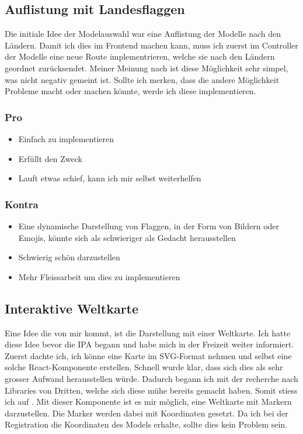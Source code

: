 \subsection{Auflistung mit Landesflaggen} \label{mdlauswl-a}
Die initiale Idee der Modelauswahl war eine Auflistung der Modelle nach den Ländern. Damit ich dies im Frontend machen kann, muss ich zuerst im Controller der Modelle eine neue Route implementrieren, welche sie nach den Ländern geordnet zurücksendet.
\newline
Meiner Meinung nach ist diese Möglichkeit sehr simpel, was nicht negativ gemeint ist. Sollte ich merken, dass die andere Möglichkeit Probleme macht oder machen könnte, werde ich diese implementieren.
\subsubsection{Pro}
\begin{itemize}
  \item Einfach zu implementieren
  \item Erfüllt den Zweck
  \item Lauft etwas schief, kann ich mir selbst weiterhelfen
\end{itemize}
\subsubsection{Kontra}
\begin{itemize}
  \item Eine dynamische Darstellung von Flaggen, in der Form von Bildern oder Emojis, könnte sich als schwieriger als Gedacht herausstellen
  \item Schwierig schön darzustellen
  \item Mehr Fleissarbeit um dies zu implementieren
\end{itemize}
\subsection{Interaktive Weltkarte} \label{mdlauswl-b}
Eine Idee die von mir kommt, ist die Darstellung mit einer Weltkarte. Ich hatte diese Idee bevor die IPA begann und habe mich in der Freizeit weiter informiert. Zuerst dachte ich, ich könne eine Karte im SVG-Format nehmen und selbst eine solche React-Komponente erstellen. Schnell wurde klar, dass sich dies als sehr grosser Aufwand herausstellen würde. Dadurch begann ich mit der recherche nach Libraries von Dritten, welche sich diese mühe bereits gemacht haben. Somit stiess ich auf \href{https://www.react-simple-maps.io/}{}.
\newline
Mit dieser Komponente ist es mir möglich, eine Weltkarte mit Markern darzustellen. Die Marker werden dabei mit Koordinaten gesetzt. Da ich bei der Registration die Koordinaten des Models erhalte, sollte dies kein Problem sein.
